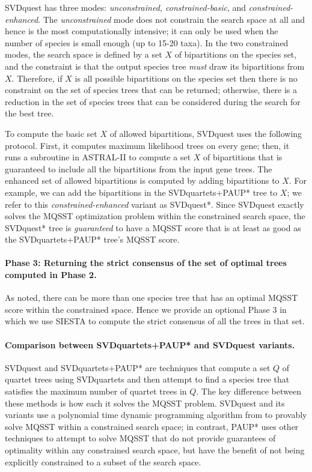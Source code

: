 SVDquest has three modes: {\em unconstrained, constrained-basic}, and
{\em constrained-enhanced}.  The {\em unconstrained} mode does not
constrain the search space at all and hence is the most
computationally intensive; it can only be used when the number of
species is small enough (up to 15-20 taxa).  In the two
constrained modes, the search space is defined by a set $X$ of
bipartitions on the species set, and the constraint is that the output
species tree {\em must} draw its bipartitions from $X$.  
Therefore, if $X$ is all possible bipartitions on the species set then
there is no constraint on the set of species trees that can be
returned; otherwise, there is a reduction in the set of species trees
that can be considered during the search for the best tree.

To compute the basic set $X$ of allowed bipartitions, SVDquest uses
the following protocol.  First, it computes maximum likelihood trees
on every gene; then, it runs a subroutine in ASTRAL-II
\cite{mirarab2015astral} to compute a set $X$ of bipartitions that is
guaranteed to include all the bipartitions from the input gene trees.
The enhanced set of allowed bipartitions is computed by adding
bipartitions to $X$. For example, we can add the bipartitions in the
SVDquartets+PAUP* tree to $X$; we refer to this \emph{constrained-enhanced}
variant as SVDquest*.  Since SVDquest exactly solves the MQSST
optimization problem within the constrained search space, the
SVDquest* tree is {\em guaranteed} to have a MQSST score that is at
least as good as the SVDquartets+PAUP* tree's MQSST score.

{
\paragraph{Phase 3: Returning the strict consensus of the set of optimal trees computed in Phase 2.}
As noted, there can be more than one species tree that has an optimal MQSST score within the constrained space.
Hence we provide an optional Phase 3 in which we use SIESTA to compute the strict consensus of all the trees in that set.
}

{
\paragraph{Comparison between SVDquartets+PAUP* and SVDquest variants. }
}

SVDquest  and SVDquartets+PAUP* are  techniques that compute a set $Q$ of quartet trees using SVDquartets and then attempt to find a species tree that satisfies the maximum number of quartet trees in $Q$.  
The key difference between these methods is how each it solves the MQSST problem. 
SVDquest and its variants use a polynomial time dynamic programming algorithm from
\cite{bryant2001constructing} to {provably} solve MQSST within a constrained search space;
in contrast, {PAUP* uses other techniques to attempt to solve MQSST that do not provide guarantees of optimality within any constrained search space, but have the benefit of  not being explicitly constrained to a subset of the search space.}



